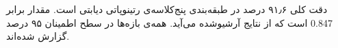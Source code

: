 %
دقت کلی ۹۱٫۶ درصد در طبقه‌بندی پنج‌کلاسه‌ی رتینوپاتی دیابتی است.
مقدار  برابر 0.847 است که از نتایج آرشیوشده می‌آید.
همه‌ی بازه‌ها در سطح اطمینان ۹۵ درصد گزارش شده‌اند. %
